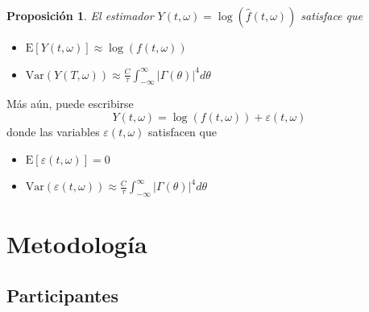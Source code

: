 \documentclass[serif,mathserif,professionalfont]{beamer}
\newtheorem{proposicion}{Proposición}
\newcommand{\intR}{\int_{-\infty}^{\infty}}
\newcommand{\est}[1]{\widehat{ #1 }}
\newcommand{\E}[1]{\mathrm{E}\left[ #1 \right]}
\newcommand{\Var}[1]{\mathrm{Var}\left( #1 \right)}
\newcommand{\abso}[1]{\left| #1 \right|}
\begin{document}

\begin{frame}
\begin{proposicion}
El estimador $ Y(t,\omega) = \log{\left( \est{f}(t,\omega)\right)}$ satisface que
\begin{itemize}
\item $\displaystyle 
\E{ Y(t,\omega) } \approx \log \left( f(t,\omega) \right)$
\item $\displaystyle 
\Var{ Y(T,\omega) } 
\approx \frac{C}{\tau} \intR \abso{\Gamma (\theta)}^{4} d\theta $
\end{itemize}
\end{proposicion}

M\'as a\'un, puede escribirse
\begin{equation*}
Y(t,\omega) = \log \left( f(t,\omega) \right) + \varepsilon(t,\omega)
\end{equation*}
donde las variables $\varepsilon(t,\omega)$ satisfacen que
\begin{itemize}
\item $\displaystyle \E{\varepsilon(t,\omega)} = 0$
\item $\displaystyle \Var{\varepsilon(t,\omega)}
\approx \frac{C}{\tau} \intR \abso{\Gamma (\theta)}^{4} d\theta$
\end{itemize}
\end{frame}



\section{Metodolog\'ia}


\subsection{Participantes}

\end{document}
